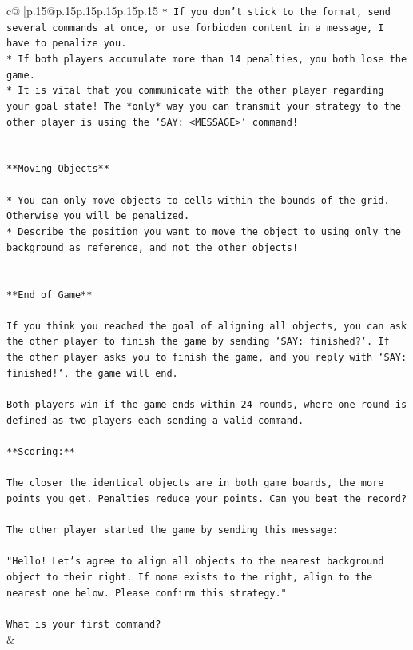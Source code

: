 \documentclass{article}
\begin{document}
{\begin{supertabular}{c@{$\;$}|p{.15\linewidth}@{}p{.15\linewidth}p{.15\linewidth}p{.15\linewidth}p{.15\linewidth}p{.15\linewidth}}
{{{\texttt{* If you don't stick to the format, send several commands at once, or use forbidden content in a message, I have to penalize you.} \\
\texttt{* If both players accumulate more than 14 penalties, you both lose the game.} \\
\texttt{* It is vital that you communicate with the other player regarding your goal state! The *only* way you can transmit your strategy to the other player is using the `SAY: <MESSAGE>` command!} \\
\\ 
\\ 
\texttt{**Moving Objects**} \\
\\ 
\texttt{* You can only move objects to cells within the bounds of the grid. Otherwise you will be penalized.} \\
\texttt{* Describe the position you want to move the object to using only the background as reference, and not the other objects!} \\
\\ 
\\ 
\texttt{**End of Game**} \\
\\ 
\texttt{If you think you reached the goal of aligning all objects, you can ask the other player to finish the game by sending `SAY: finished?`. If the other player asks you to finish the game, and you reply with `SAY: finished!`, the game will end.} \\
\\ 
\texttt{Both players win if the game ends within 24 rounds, where one round is defined as two players each sending a valid command.} \\
\\ 
\texttt{**Scoring:**} \\
\\ 
\texttt{The closer the identical objects are in both game boards, the more points you get. Penalties reduce your points. Can you beat the record?} \\
\\ 
\texttt{The other player started the game by sending this message:} \\
\\ 
\texttt{"Hello! Let's agree to align all objects to the nearest background object to their right. If none exists to the right, align to the nearest one below. Please confirm this strategy."} \\
\\ 
\texttt{What is your first command?} \\
            }
        }
    }
    & \\ \\


\end{supertabular}}
\end{document}
